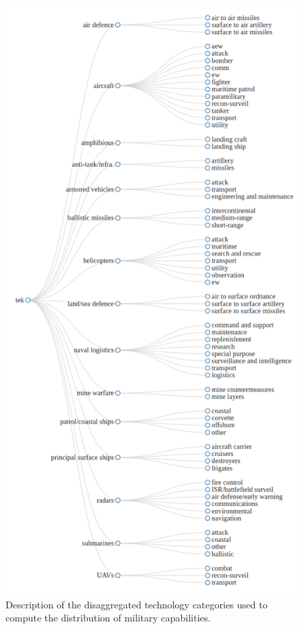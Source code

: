 \documentclass[
]{article}
\begin{document}
\begin{figure}
\includegraphics[width=10.85in]{figures/dendrogram_subjective_full} \caption{Description of the disaggregated technology categories used to compute the distribution of military capabilities.}\label{fig:dendrogram}
\end{figure}
\end{document}

